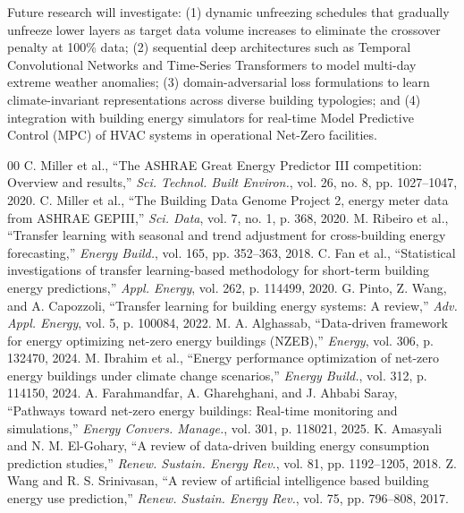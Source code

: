 \documentclass[conference]{IEEEtran}
\begin{document}
Future research will investigate: (1) dynamic unfreezing schedules that gradually unfreeze lower layers as target data volume increases to eliminate the crossover penalty at 100\% data; (2) sequential deep architectures such as Temporal Convolutional Networks and Time-Series Transformers to model multi-day extreme weather anomalies; (3) domain-adversarial loss formulations to learn climate-invariant representations across diverse building typologies; and (4) integration with building energy simulators for real-time Model Predictive Control (MPC) of HVAC systems in operational Net-Zero facilities.

\clearpage
\begin{thebibliography}{00}
\setlength{\itemsep}{1.2pt plus 0.5pt minus 0.5pt}
\setlength{\parskip}{0pt}
\small
{} C. Miller et al., ``The ASHRAE Great Energy Predictor III competition: Overview and results,'' \textit{Sci. Technol. Built Environ.}, vol. 26, no. 8, pp. 1027--1047, 2020.
 C. Miller et al., ``The Building Data Genome Project 2, energy meter data from ASHRAE GEPIII,'' \textit{Sci. Data}, vol. 7, no. 1, p. 368, 2020.
 M. Ribeiro et al., ``Transfer learning with seasonal and trend adjustment for cross-building energy forecasting,'' \textit{Energy Build.}, vol. 165, pp. 352--363, 2018.
 C. Fan et al., ``Statistical investigations of transfer learning-based methodology for short-term building energy predictions,'' \textit{Appl. Energy}, vol. 262, p. 114499, 2020.
 G. Pinto, Z. Wang, and A. Capozzoli, ``Transfer learning for building energy systems: A review,'' \textit{Adv. Appl. Energy}, vol. 5, p. 100084, 2022.
 M. A. Alghassab, ``Data-driven framework for energy optimizing net-zero energy buildings (NZEB),'' \textit{Energy}, vol. 306, p. 132470, 2024.
 M. Ibrahim et al., ``Energy performance optimization of net-zero energy buildings under climate change scenarios,'' \textit{Energy Build.}, vol. 312, p. 114150, 2024.
 A. Farahmandfar, A. Gharehghani, and J. Ahbabi Saray, ``Pathways toward net-zero energy buildings: Real-time monitoring and simulations,'' \textit{Energy Convers. Manage.}, vol. 301, p. 118021, 2025.
 K. Amasyali and N. M. El-Gohary, ``A review of data-driven building energy consumption prediction studies,'' \textit{Renew. Sustain. Energy Rev.}, vol. 81, pp. 1192--1205, 2018.
 Z. Wang and R. S. Srinivasan, ``A review of artificial intelligence based building energy use prediction,'' \textit{Renew. Sustain. Energy Rev.}, vol. 75, pp. 796--808, 2017.

\end{thebibliography}
\end{document}
